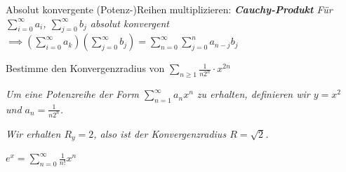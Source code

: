 \begin{exercise}
    Absolut konvergente (Potenz-)Reihen multiplizieren:
\textit{\textbf{Cauchy-Produkt} Für $\sum_{i=0}^{\infty}a_i$, $\sum_{j=0}^{\infty}b_j$ absolut konvergent $\implies (\sum_{i=0}^{\infty} a_k)(\sum_{j=0}^{\infty}b_j)=\sum_{n=0}^{\infty}\sum_{j=0}^{n}a_{n-j}b_j$}    
\end{exercise}

\begin{exercise}
    Bestimme den Konvergenzradius von $\sum_{n\geq 1}\frac{1}{n2^n}\cdot x^{2n}$

    \textit{
        Um eine Potenzreihe der Form $\sum_{n=1}^{\infty} a_nx^n$ zu erhalten, definieren wir $y=x^2$ und $a_n=\frac{1}{n 2^n}$.
    }

    \textit{Wir erhalten $R_y=2$, also ist der Konvergenzradius $R=\sqrt{2}$.}
\end{exercise}

$e^x = \sum_{n=0}^{\infty} \frac{1}{n!}x^n$